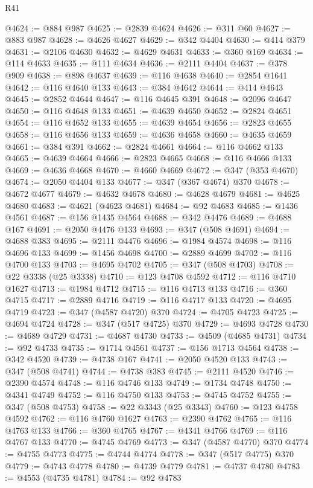 \begin{lexlean}{R41}
\begin{coremodule}
@4624 := @884 @987
@4625 := @2839 @4624
@4626 := @311 @60
@4627 := @883 @987
@4628 := @4626 @4627
@4629 := @342 @4404
@4630 := @414 @379
@4631 := @2106 @4630
@4632 := @4629 @4631
@4633 := @360 @169
@4634 := @114 @4633
@4635 := @111 @4634
@4636 := @2111 @4404
@4637 := @378 @909
@4638 := @898 @4637
@4639 := @116 @4638
@4640 := @2854 @1641
@4642 := @116 @4640 @133
@4643 := @384 @4642
@4644 := @414 @4643
@4645 := @2852 @4644
@4647 := @116 @4645 @391
@4648 := @2096 @4647
@4650 := @116 @4648 @133
@4651 := @4639 @4650
@4652 := @2824 @4651
@4654 := @116 @4652 @133
@4655 := @4639 @4654
@4656 := @2823 @4655
@4658 := @116 @4656 @133
@4659 := @4636 @4658
@4660 := @4635 @4659
@4661 := @384 @391
@4662 := @2824 @4661
@4664 := @116 @4662 @133
@4665 := @4639 @4664
@4666 := @2823 @4665
@4668 := @116 @4666 @133
@4669 := @4636 @4668
@4670 := @4660 @4669
@4672 := @347 (@353 @4670)
@4674 := @2050 @4404 @133
@4677 := @347 (@367 @4674) @370
@4678 := @4672 @4677
@4679 := @4632 @4678
@4680 := @4628 @4679
@4681 := @4625 @4680
@4683 := @4621 (@4623 @4681)
@4684 := @92 @4683
@4685 := @1436 @4561
@4687 := @156 @1435 @4564
@4688 := @342 @4476
@4689 := @4688 @167
@4691 := @2050 @4476 @133
@4693 := @347 (@508 @4691)
@4694 := @4688 @383
@4695 := @2111 @4476
@4696 := @1984 @4574
@4698 := @116 @4696 @133
@4699 := @1456 @4698
@4700 := @2889 @4699
@4702 := @116 @4700 @133
@4703 := @4695 @4702
@4705 := @347 (@508 @4703)
@4708 := @22 @3338 (@25 @3338)
@4710 := @123 @4708 @4592
@4712 := @116 @4710 @1627
@4713 := @1984 @4712
@4715 := @116 @4713 @133
@4716 := @360 @4715
@4717 := @2889 @4716
@4719 := @116 @4717 @133
@4720 := @4695 @4719
@4723 := @347 (@4587 @4720) @370
@4724 := @4705 @4723
@4725 := @4694 @4724
@4728 := @347 (@517 @4725) @370
@4729 := @4693 @4728
@4730 := @4689 @4729
@4731 := @4687 @4730
@4733 := @4509 (@4685 @4731)
@4734 := @92 @4733
@4735 := @1714 @4561
@4737 := @156 @1713 @4564
@4738 := @342 @4520
@4739 := @4738 @167
@4741 := @2050 @4520 @133
@4743 := @347 (@508 @4741)
@4744 := @4738 @383
@4745 := @2111 @4520
@4746 := @2390 @4574
@4748 := @116 @4746 @133
@4749 := @1734 @4748
@4750 := @4341 @4749
@4752 := @116 @4750 @133
@4753 := @4745 @4752
@4755 := @347 (@508 @4753)
@4758 := @22 @3343 (@25 @3343)
@4760 := @123 @4758 @4592
@4762 := @116 @4760 @1627
@4763 := @2390 @4762
@4765 := @116 @4763 @133
@4766 := @360 @4765
@4767 := @4341 @4766
@4769 := @116 @4767 @133
@4770 := @4745 @4769
@4773 := @347 (@4587 @4770) @370
@4774 := @4755 @4773
@4775 := @4744 @4774
@4778 := @347 (@517 @4775) @370
@4779 := @4743 @4778
@4780 := @4739 @4779
@4781 := @4737 @4780
@4783 := @4553 (@4735 @4781)
@4784 := @92 @4783

\end{coremodule}
\end{lexlean}
